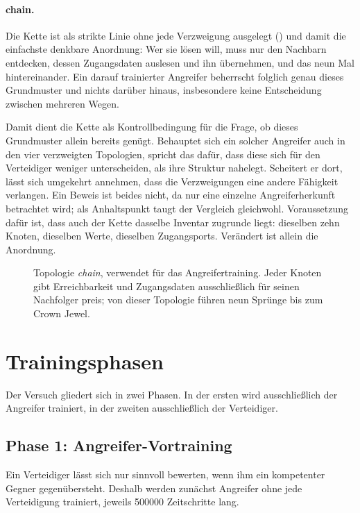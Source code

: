 \paragraph{chain.}
Die Kette ist als strikte Linie ohne jede Verzweigung ausgelegt
() und damit die einfachste denkbare Anordnung: Wer sie
lösen will, muss nur den Nachbarn entdecken, dessen Zugangsdaten auslesen und
ihn übernehmen, und das neun Mal hintereinander. Ein darauf trainierter
Angreifer beherrscht folglich genau dieses Grundmuster und nichts darüber
hinaus, insbesondere keine Entscheidung zwischen mehreren Wegen.

Damit dient die Kette als Kontrollbedingung für die Frage, ob dieses
Grundmuster allein bereits genügt. Behauptet sich ein solcher Angreifer auch in
den vier verzweigten Topologien, spricht das dafür, dass diese sich für den
Verteidiger weniger unterscheiden, als ihre Struktur nahelegt. Scheitert er
dort, lässt sich umgekehrt annehmen, dass die Verzweigungen eine andere
Fähigkeit verlangen. Ein Beweis ist beides nicht, da nur eine einzelne
Angreiferherkunft betrachtet wird; als Anhaltspunkt taugt der Vergleich
gleichwohl. Voraussetzung dafür ist, dass auch der Kette dasselbe Inventar
zugrunde liegt: dieselben zehn Knoten, dieselben Werte, dieselben
Zugangsports. Verändert ist allein die Anordnung.

\begin{figure}[H]
  \centering
  
  \caption[Topologie \emph{chain}]{Topologie \emph{chain}, verwendet für das
  Angreifertraining. Jeder Knoten gibt Erreichbarkeit und Zugangsdaten
  ausschließlich für seinen Nachfolger preis; von dieser Topologie führen neun
  Sprünge bis zum Crown Jewel.}
  \label{fig:topo-chain}
\end{figure}

\section{Trainingsphasen}
\label{sec:phasen}

Der Versuch gliedert sich in zwei Phasen. In der ersten wird ausschließlich der
Angreifer trainiert, in der zweiten ausschließlich der Verteidiger.

\subsection{Phase 1: Angreifer-Vortraining}

Ein Verteidiger lässt sich nur sinnvoll bewerten, wenn ihm ein kompetenter
Gegner gegenübersteht. Deshalb werden zunächst Angreifer ohne jede Verteidigung
trainiert, jeweils \num{500000} Zeitschritte lang.

